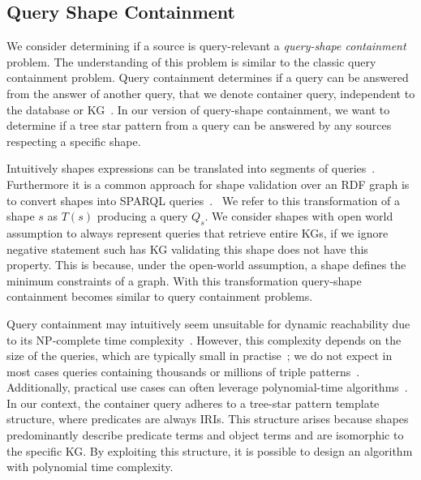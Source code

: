 \subsection{Query Shape Containment}\label{sec:containment}

We consider determining if a source is query-relevant a \emph{query-shape containment} problem.
The understanding of this problem is similar to the classic query containment problem.
Query containment determines if a query can be answered from the answer of another query, that we denote container query, independent to the database or KG~\cite{afariQCE, Spasi2023}.
In our version of query-shape containment, we want to determine if a tree star pattern from a query can be answered by any sources respecting a specific shape.

Intuitively shapes expressions can be translated into segments of queries~\cite{delva2023}.
Furthermore it is a common approach for shape validation over an RDF graph is to convert shapes into SPARQL queries~\cite{labragayo2017validatingdescribinglinkeddata, Corman2019,Prestamo2023, spapeExpressionConvert}.~
We refer to this transformation of a shape $s$ as $T(s)$ producing a query $Q_s$.
We consider shapes with open world assumption to always represent queries that retrieve entire KGs, if we ignore negative statement such has KG validating this shape does not have this property.
This is because, under the open-world assumption, a shape defines the minimum constraints of a graph.
With this transformation query-shape containment becomes similar to query containment problems.

Query containment may intuitively seem unsuitable for dynamic reachability due to its NP-complete time complexity~\cite{Spasi2023}.
However, this complexity depends on the size of the queries, which are typically small in practise~\cite{Doan2012}; we do not expect in most cases queries containing thousands or millions of triple patterns~\cite{Bonifati2019}.
Additionally, practical use cases can often leverage polynomial-time algorithms~\cite{Doan2012}.
In our context, the container query adheres to a tree-star pattern template structure, where predicates are always IRIs.
This structure arises because shapes predominantly describe predicate terms and object terms and are isomorphic to the specific KG.
By exploiting this structure, it is possible to design an algorithm with polynomial time complexity.

